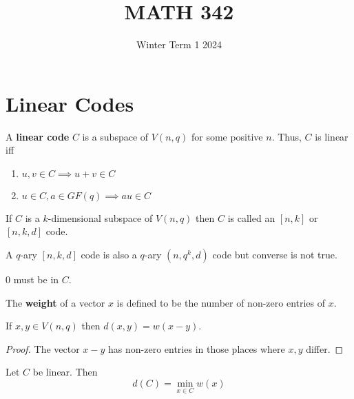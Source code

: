 \documentclass{article}
\title{MATH 342}
\date{Winter Term 1 2024}
\begin{document}
\maketitle

\begin{tcolorbox}[title=,
  fonttitle=\huge\sffamily\bfseries\selectfont,interior style={left
      color=contcol1!40!white,right color=contcol2!40!white},frame
  style={left color=contcol1!80!white,right
  color=contcol2!80!white},coltitle=black,top=2mm,bottom=2mm,left=2mm,right=2mm,drop
  fuzzy shadow,enhanced,breakable]
  \tableofcontents
\end{tcolorbox}

\newpage

\section{Linear Codes}
\begin{definition}
  A \textbf{linear code} \( C \) is a subspace of \( V(n, q) \) for
  some positive \( n \). Thus, \( C \) is linear iff
  \begin{enumerate}
    \item \( u, v \in C \implies u + v \in C \)
    \item \( u \in C, a \in GF(q) \implies au \in C \)
  \end{enumerate}

  If \( C \) is a \( k \)-dimensional subspace of \( V(n, q) \) then
  \( C \) is called an \( [n, k] \) or \( [n, k, d] \) code.
\end{definition}
\begin{remark}
  A \( q \)-ary \( [n, k, d] \) code is also a \( q \)-ary \( (n,
  q^k, d) \) code but converse is not true.

  \( 0 \) must be in \( C \).
\end{remark}
\begin{definition}
  The \textbf{weight} of a vector \( x \) is defined to be the number
  of non-zero entries of \( x \).
\end{definition}
\begin{lemma}
  If \( x, y \in V(n, q) \) then \(
  d(x, y) = w(x - y) \).
\end{lemma}
\begin{proof}
  The vector \( x-y \) has non-zero entries in those places where \(
  x, y \) differ.
\end{proof}
\begin{theorem}
  Let \( C \) be linear. Then \[
    d(C) = \min_{x \in C}w(x)
  \]
\end{theorem}
\end{document}
